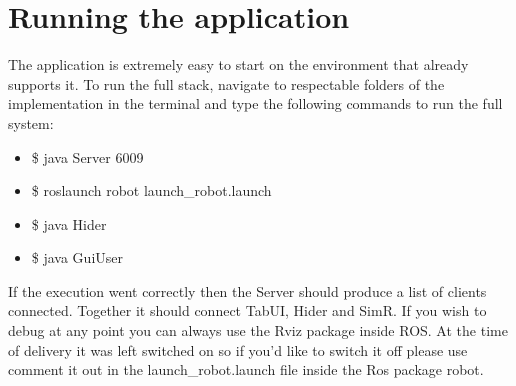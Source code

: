 		\section{Running the application}
		The application is extremely easy to start on the environment that already supports it. To run the full stack, navigate to respectable folders of the implementation in the terminal and type the following commands to run the full system:
		\begin{itemize}
			\item \$ java Server 6009
			\item \$ roslaunch robot launch\_robot.launch
			\item \$ java Hider
			\item \$ java GuiUser
		\end{itemize}
		If the execution went correctly then the Server should produce a list of clients connected. Together it should connect TabUI, Hider and SimR. If you wish to debug at any point you can always use the Rviz package inside ROS. At the time of delivery it was left switched on so if you'd like to switch it off please use comment it out in the launch\_robot.launch file inside the Ros package robot.